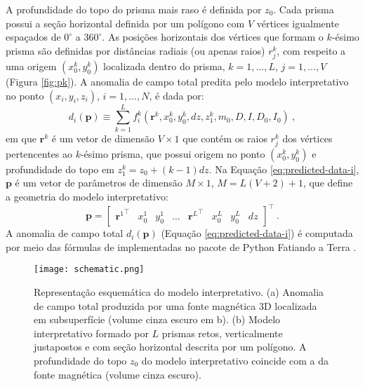 A profundidade do topo do prisma mais raso é definida por $z_{0}$.
Cada prisma possui a seção horizontal definida por um polígono com $V$ vértices igualmente espaçados de $0^{\circ}$ a $360^{\circ}$.
As posições horizontais dos vértices que formam o $k$-ésimo prisma
são definidas por distâncias radiais (ou apenas raios) $r^{k}_{j}$, com respeito a uma origem $(x_{0}^{k}, y_{0}^{k})$ localizada dentro do prisma, $k = 1, \dots, L$, $j = 1, \dots, V$ (Figura \ref{fig:pk}).
A anomalia de campo total predita pelo modelo interpretativo no ponto $(x_{i}, y_{i}, z_{i})$, $i = 1, \dots, N$, é dada por:
\begin{equation}
d_{i} (\mathbf{p}) \equiv \sum\limits_{k=1}^{L} f_{i}^{k}(\mathbf{r}^{k}, x_{0}^{k}, y_{0}^{k}, dz, z_{1}^{k}, m_{0}, D, I, D_{0}, I_{0}) \: ,
\label{eq:predicted-data-i}
\end{equation}
em que $\mathbf{r}^{k}$ é um vetor de dimensão $V \times 1$ que contém os raios $r^{k}_{j}$ dos vértices pertencentes ao $k$-ésimo prisma, que possui origem no ponto $(x_{0}^{k}, y_{0}^{k})$ e profundidade do topo em $z_{1}^{k} = z_{0} + (k-1)dz$.
Na Equação \ref{eq:predicted-data-i}, $\mathbf{p}$ é um vetor de parâmetros de dimensão $M \times 1$, $ M=L(V+2) +1 $, que define a geometria do modelo interpretativo:
\begin{equation}
\mathbf{p} = \begin{bmatrix} 
{\mathbf{r}^{1}}^{\top} & x_{0}^{1} & y_{0}^{1} & \dots & 
{\mathbf{r}^{L}}^{\top} & x_{0}^{L} & y_{0}^{L} & dz
\end{bmatrix}^{\top} \: .
\label{eq:p-vector}
\end{equation}
A anomalia de campo total $d_{i} (\mathbf{p})$ 
(Equação \ref{eq:predicted-data-i}) é computada por meio das fórmulas de \cite{plouff1976} implementadas no pacote de Python 
Fatiando a Terra \citep{uieda-etal2013}.

\begin{figure}[!htb]
	\centering
	\texttt{[image: schematic.png]}
	\caption{Representação esquemática do modelo interpretativo. (a) Anomalia de campo total produzida por uma fonte magnética 3D localizada em subsuperfície (volume cinza escuro em b). (b) Modelo interpretativo formado por $ L $ prismas retos, verticalmente justapostos e com seção horizontal descrita por um polígono. A profundidade do topo $z_0$ do modelo interpretativo coincide com a da fonte magnética (volume cinza escuro).}
	\label{fig:schematic}
\end{figure}


